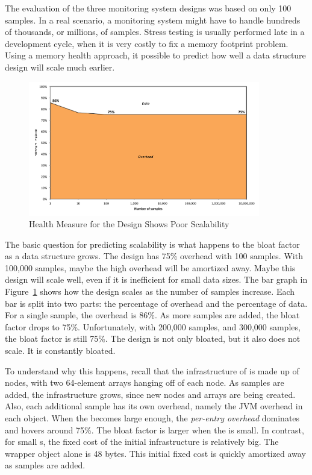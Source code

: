 The evaluation of the three monitoring system designs was based on only 100
samples. In a real scenario, a monitoring system might have to handle hundreds
of thousands, or millions, of samples. Stress testing is usually performed late
in a development cycle, when it is very costly to fix a memory footprint
problem. Using a memory health approach, it possible to predict how well a data
structure design will scale much earlier.
 
\begin{figure}
  \centering
   \includegraphics[width=0.9\textwidth]{part1/Figures/memoryhealth/scalable-health-treemap}
  \caption{Health Measure for the  Design Shows Poor Scalability}
  \label{fig:scalable-health-treemap}
\end{figure}
The basic question for predicting scalability is what happens to the bloat
factor as a data structure grows. The  design has 75\% overhead
with 100 samples. With 100,000 samples, maybe the high overhead will be
amortized away. Maybe this design will scale well, even if it is inefficient for
small data sizes. The bar graph in Figure~\ref{fig:scalable-health-treemap}
shows how the  design scales as the number of samples increase.
Each bar is split into two parts: the percentage of overhead and the percentage
of data. For a single sample, the overhead is 86\%. As more samples are added,
the bloat factor drops to 75\%. Unfortunately, with 200,000 samples, and 300,000
samples, the bloat factor is still 75\%. The  design is not only
bloated, but it also does not scale. It is constantly bloated.

To understand why this happens, recall that the infrastructure of 
is made up of nodes, with two 64-element arrays hanging off of each node. As
samples are added, the infrastructure grows, since new nodes and arrays are
being created. Also, each additional sample has its own overhead, namely the JVM
overhead in each  object. When the  becomes large
enough, the \textit{per-entry overhead} dominates and hovers around 75\%. The
bloat factor is larger when the  is small. In contrast, for small
s, the fixed cost of the initial  infrastructure is
relatively big. The  wrapper object alone is 48 bytes. This
initial fixed cost is quickly amortized away as samples are added.

